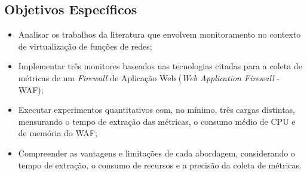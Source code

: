 \subsection{Objetivos Específicos}

\begin{itemize}
  \item Analisar os trabalhos da literatura que envolvem monitoramento no contexto de virtualização de funções de redes;
  \item Implementar três monitores baseados nas tecnologias citadas para a coleta de métricas de um \textit{Firewall} de Aplicação Web (\textit{Web Application Firewall} - WAF);
  \item Executar experimentos quantitativos com, no mínimo, três cargas distintas, mensurando o tempo de extração das métricas, o consumo médio de CPU e de memória do WAF;
  \item Compreender as vantagens e limitações de cada abordagem, considerando o tempo de extração, o consumo de recursos e a precisão da coleta de métricas.
\end{itemize}
